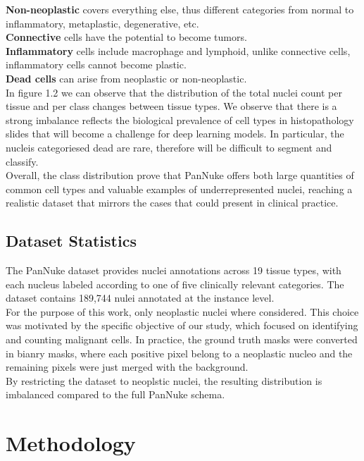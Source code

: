 \documentclass[target=bach,aauheader=,style=]{thud}
\begin{document}
\textbf{Non-neoplastic} covers everything else, thus different categories from normal to inflammatory, metaplastic, degenerative, etc.\\
\textbf{Connective} cells have the potential to become tumors.\\
\textbf{Inflammatory} cells include macrophage and lymphoid, unlike connective cells, inflammatory cells cannot become plastic.\\
\textbf{Dead cells} can arise from neoplastic or non-neoplastic.\\

In figure 1.2 we can observe that the distribution of the total nuclei count per tissue and per class changes between tissue types. We observe that there is a strong imbalance reflects the biological prevalence of cell types in histopathology slides that will become a challenge for deep learning models. In particular, the nucleis categoriesed dead are rare, therefore will be difficult to segment and classify.\\
Overall, the class distribution prove that PanNuke offers both large quantities of common cell types and valuable examples of underrepresented nuclei, reaching a realistic dataset that mirrors the cases that could present in clinical practice.

\section{Dataset Statistics}
The PanNuke dataset provides nuclei annotations across 19 tissue types, with each nucleus labeled according to one of five clinically relevant categories. The dataset contains 189,744 nulei annotated at the instance level.\\
For the purpose of this work, only neoplastic nuclei where considered. This choice was motivated by the specific objective of our study, which focused on identifying and counting malignant cells. In practice, the ground truth masks were converted in bianry masks, where each positive pixel belong to a neoplastic nucleo and the remaining pixels were just merged with the background.\\

By restricting the dataset to neoplstic nuclei, the resulting distribution is imbalanced compared to the full PanNuke schema.
\chapter{Methodology}
\end{document}
